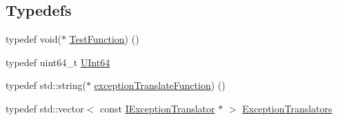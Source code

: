 \subsection*{Typedefs}
\begin{DoxyCompactItemize}
\item 
typedef void($\ast$ \mbox{\hyperlink{namespace_catch_a26414f52d0835939fae52aadd27e6257}{Test\+Function}}) ()
\item 
typedef uint64\+\_\+t \mbox{\hyperlink{namespace_catch_a47aaf167582b2a30e5acd3bd874deb05}{U\+Int64}}
\item 
typedef std\+::string($\ast$ \mbox{\hyperlink{namespace_catch_a14edb319150d3e108bbdef994f9eec2a}{exception\+Translate\+Function}}) ()
\item 
typedef std\+::vector$<$ const \mbox{\hyperlink{struct_catch_1_1_i_exception_translator}{I\+Exception\+Translator}} $\ast$ $>$ \mbox{\hyperlink{namespace_catch_ae0442a3627f91437716106138b5f540b}{Exception\+Translators}}
\end{DoxyCompactItemize}
